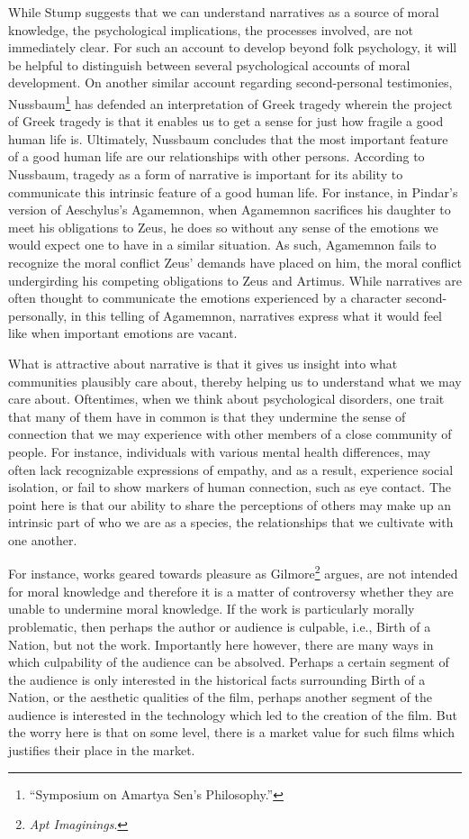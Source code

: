 \documentclass[phdthesis,12pt,final]{wuthesis}
\theoremstyle{definition}
\theoremstyle{definition}
\theoremstyle{definition}
\theoremstyle{definition}
\theoremstyle{remark}
\begin{document}
While Stump suggests that we can understand narratives as a source of moral knowledge, the psychological implications, the processes involved, are not immediately clear. For such an account to develop beyond folk psychology, it will be helpful to distinguish between several psychological accounts of moral development. On another similar account regarding second-personal testimonies, Nussbaum\footnote{{``Symposium on {Amartya Sen}'s Philosophy.''}} has defended an interpretation of Greek tragedy wherein the project of Greek tragedy is that it enables us to get a sense for just how fragile a good human life is. Ultimately, Nussbaum concludes that the most important feature of a good human life are our relationships with other persons. According to Nussbaum, tragedy as a form of narrative is important for its ability to communicate this intrinsic feature of a good human life. For instance, in Pindar's version of Aeschylus's Agamemnon, when Agamemnon sacrifices his daughter to meet his obligations to Zeus, he does so without any sense of the emotions we would expect one to have in a similar situation. As such, Agamemnon fails to recognize the moral conflict Zeus' demands have placed on him, the moral conflict undergirding his competing obligations to Zeus and Artimus. While narratives are often thought to communicate the emotions experienced by a character second-personally, in this telling of Agamemnon, narratives express what it would feel like when important emotions are vacant.

What is attractive about narrative is that it gives us insight into what communities plausibly care about, thereby helping us to understand what we may care about. Oftentimes, when we think about psychological disorders, one trait that many of them have in common is that they undermine the sense of connection that we may experience with other members of a close community of people. For instance, individuals with various mental health differences, may often lack recognizable expressions of empathy, and as a result, experience social isolation, or fail to show markers of human connection, such as eye contact. The point here is that our ability to share the perceptions of others may make up an intrinsic part of who we are as a species, the relationships that we cultivate with one another.

For instance, works geared towards pleasure as Gilmore\footnote{\emph{Apt {Imaginings}}.} argues, are not intended for moral knowledge and therefore it is a matter of controversy whether they are unable to undermine moral knowledge. If the work is particularly morally problematic, then perhaps the author or audience is culpable, i.e., Birth of a Nation, but not the work. Importantly here however, there are many ways in which culpability of the audience can be absolved. Perhaps a certain segment of the audience is only interested in the historical facts surrounding Birth of a Nation, or the aesthetic qualities of the film, perhaps another segment of the audience is interested in the technology which led to the creation of the film. But the worry here is that on some level, there is a market value for such films which justifies their place in the market.
\end{document}
